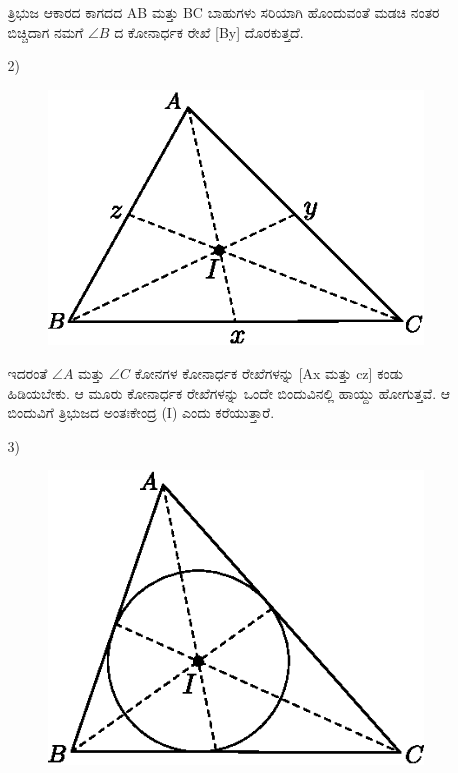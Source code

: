 \begin{enumerate}
\begin{itemize}
 
 ತ್ರಿಭುಜ ಆಕಾರದ ಕಾಗದದ  AB ಮತ್ತು BC ಬಾಹುಗಳು ಸರಿಯಾಗಿ ಹೊಂದುವಂತೆ ಮಡಚಿ ನಂತರ ಬಿಚ್ಚಿದಾಗ ನಮಗೆ $\angle B$ ದ ಕೋನಾರ್ಧಕ ರೇಖೆ  [By] ದೊರಕುತ್ತದೆ. 
 
 \item[2)] 
 ~
 \begin{figure}[H]
\centering
\includegraphics[scale=.98]{src/figure/chap1/fig1-37b.eps}
\end{figure}
 
 
 ಇದರಂತೆ  $\angle A$ ಮತ್ತು  $\angle C$ ಕೋನಗಳ ಕೋನಾರ್ಧಕ ರೇಖೆಗಳನ್ನು [Ax ಮತ್ತು  cz] ಕಂಡು ಹಿಡಿಯಬೇಕು. ಆ ಮೂರು ಕೋನಾರ್ಧಕ ರೇಖೆಗಳನ್ನು ಒಂದೇ ಬಿಂದುವಿನಲ್ಲಿ ಹಾಯ್ದು ಹೋಗುತ್ತವೆ. ಆ ಬಿಂದುವಿಗೆ ತ್ರಿಭುಜದ ಅಂತಃಕೇಂದ್ರ  (I) ಎಂದು ಕರೆಯುತ್ತಾರೆ. 
 
  \item[3)] 
 ~
  \begin{figure}[H]
\centering
\includegraphics[scale=.98]{src/figure/chap1/fig1-37c.eps}
\end{figure}
 

\end{itemize}
\end{enumerate}
